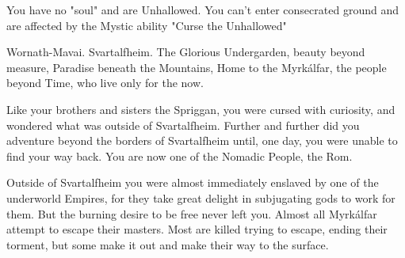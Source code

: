 {  
    
  You have no "soul" and are Unhallowed. You can't enter consecrated ground and are affected by the Mystic ability "Curse the Unhallowed"

  \cbreak



  \newpage






  Wornath-Mavai. Svartalfheim. The Glorious Undergarden, beauty beyond measure, Paradise beneath the Mountains, Home to the Myrkálfar, the people beyond Time, who live only for the now.

  Like your brothers and sisters the Spriggan, you were cursed with curiosity, and wondered what was outside of Svartalfheim.  Further and further did you adventure beyond the borders of Svartalfheim until, one day, you were unable to find your way back.  You are now one of the Nomadic People, the Rom.

  Outside of Svartalfheim you were almost immediately enslaved by one of the underworld Empires, for they take great delight in subjugating gods to work for them.  But the burning desire to be free never left you. Almost all Myrkálfar attempt to escape their masters.  Most are killed trying to escape, ending their torment, but some make it out and make their way to the surface.  

}
